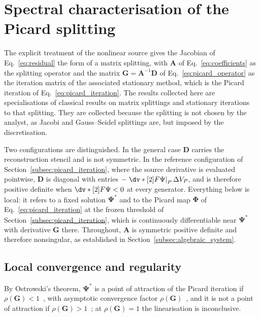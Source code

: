 \section{Spectral characterisation of the Picard splitting}
\label{sec:spectral}

The explicit treatment of the nonlinear source gives the Jacobian of Eq.~\eqref{eq:residual} the form of a matrix splitting, with $\mathbf{A}$ of Eq.~\eqref{eq:coefficients} as the splitting operator and the matrix $\mathbf{G}=\mathbf{A}^{-1}\mathbf{D}$ of Eq.~\eqref{eq:picard_operator} as the iteration matrix of the associated stationary method, which is the Picard iteration of Eq.~\eqref{eq:picard_iteration}. The results collected here are specialisations of classical results on matrix splittings and stationary iterations~\cite{Varga2000MatrixAnalysis,Young1971IterativeSystems} to that splitting. They are collected because the splitting is not chosen by the analyst, as Jacobi and Gauss--Seidel splittings are, but imposed by the discretisation.

Two configurations are distinguished. In the general case $\mathbf{D}$ carries the reconstruction stencil and is not symmetric. In the reference configuration of Section~\ref{subsec:picard_iteration}, where the source derivative is evaluated pointwise, $\mathbf{D}$ is diagonal with entries $-\left.\dv*[2]{F}{\Psi}\right|_{P}\Delta V_{P}$, and is therefore positive definite when $\dv*[2]{F}{\Psi}<0$ at every generator. Everything below is local: it refers to a fixed solution $\bm{\Psi}^{\ast}$ and to the Picard map $\bm{\Phi}$ of Eq.~\eqref{eq:picard_iteration} at the frozen threshold of Section~\ref{subsec:picard_iteration}, which is continuously differentiable near $\bm{\Psi}^{\ast}$ with derivative $\mathbf{G}$ there. Throughout, $\mathbf{A}$ is symmetric positive definite and therefore nonsingular, as established in Section~\ref{subsec:algebraic_system}.

\subsection{Local convergence and regularity}
\label{subsec:convergence_regularity}

By Ostrowski's theorem, $\bm{\Psi}^{\ast}$ is a point of attraction of the Picard iteration if $\rho(\mathbf{G})<1$~\cite[Theorem~10.1.3]{Ortega2000IterativeVariables}, with asymptotic convergence factor $\rho(\mathbf{G})$~\cite{Ortega2000IterativeVariables}, and it is not a point of attraction if $\rho(\mathbf{G})>1$~\cite{Ostrowski1973SolutionSpaces}; at $\rho(\mathbf{G})=1$ the linearisation is inconclusive.


